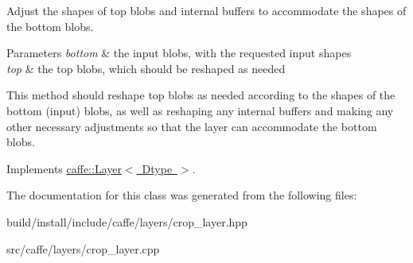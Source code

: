 Adjust the shapes of top blobs and internal buffers to accommodate the shapes of the bottom blobs. 


\begin{DoxyParams}{Parameters}
{\em bottom} & the input blobs, with the requested input shapes \\
\hline
{\em top} & the top blobs, which should be reshaped as needed\\
\hline
\end{DoxyParams}
This method should reshape top blobs as needed according to the shapes of the bottom (input) blobs, as well as reshaping any internal buffers and making any other necessary adjustments so that the layer can accommodate the bottom blobs. 

Implements \mbox{\hyperlink{classcaffe_1_1_layer_a7fe981e8af8d93d587acf2a952be563d}{caffe\+::\+Layer$<$ Dtype $>$}}.



The documentation for this class was generated from the following files\+:\begin{DoxyCompactItemize}
\item 
build/install/include/caffe/layers/crop\+\_\+layer.\+hpp\item 
src/caffe/layers/crop\+\_\+layer.\+cpp\end{DoxyCompactItemize}
